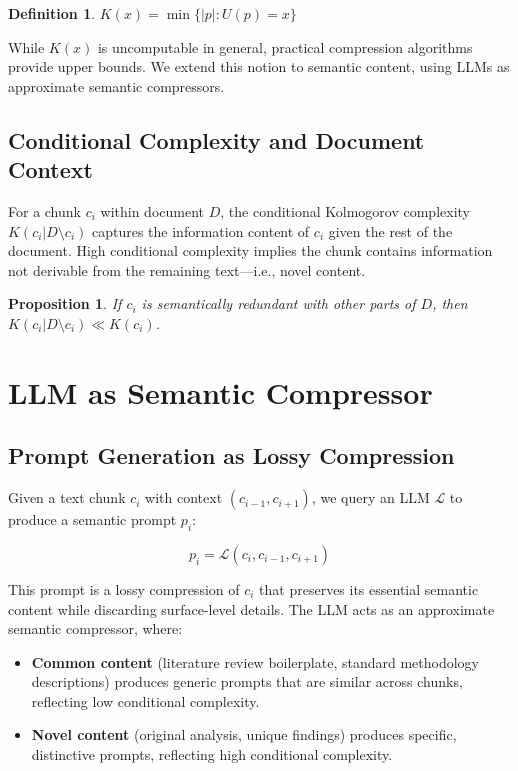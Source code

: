 \documentclass[11pt,a4paper]{article}
\newtheorem{definition}{Definition}
\newtheorem{proposition}{Proposition}
\begin{document}
\begin{definition}
$K(x) = \min\{|p| : U(p) = x\}$
\end{definition}

While $K(x)$ is uncomputable in general, practical compression algorithms
provide upper bounds. We extend this notion to semantic content, using LLMs as
approximate semantic compressors.

\subsection{Conditional Complexity and Document Context}

For a chunk $c_i$ within document $D$, the conditional Kolmogorov complexity
$K(c_i | D \setminus c_i)$ captures the information content of $c_i$ given the
rest of the document. High conditional complexity implies the chunk contains
information not derivable from the remaining text---i.e., novel content.

\begin{proposition}
If $c_i$ is semantically redundant with other parts of $D$, then
$K(c_i | D \setminus c_i) \ll K(c_i)$.
\end{proposition}

\section{LLM as Semantic Compressor}

\subsection{Prompt Generation as Lossy Compression}

Given a text chunk $c_i$ with context $(c_{i-1}, c_{i+1})$, we query an LLM
$\mathcal{L}$ to produce a semantic prompt $p_i$:

\begin{equation}
p_i = \mathcal{L}(c_i, c_{i-1}, c_{i+1})
\end{equation}

This prompt is a lossy compression of $c_i$ that preserves its essential
semantic content while discarding surface-level details. The LLM acts as an
approximate semantic compressor, where:

\begin{itemize}
\item \textbf{Common content} (literature review boilerplate, standard
methodology descriptions) produces generic prompts that are similar across
chunks, reflecting low conditional complexity.
\item \textbf{Novel content} (original analysis, unique findings) produces
specific, distinctive prompts, reflecting high conditional complexity.
\end{itemize}
\end{document}
